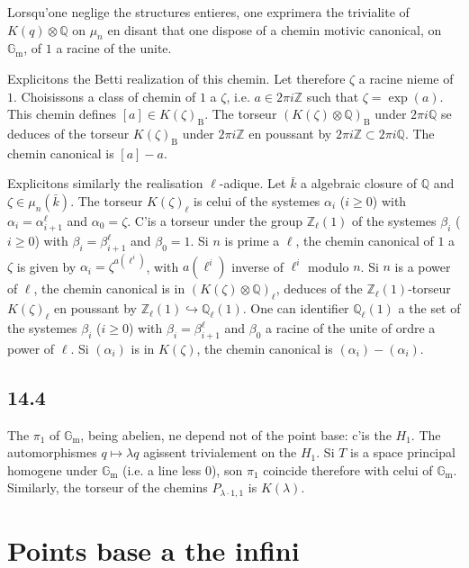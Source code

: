 \documentclass[12pt,a4paper]{article}
\theoremstyle{plain}
\theoremstyle{definition}
\theoremstyle{remark}
\newcommand*{\Gm}{\mathbb{G}_\mathrm{m}}
\newcommand{\bZ}{\mathbb{Z}}
\newcommand{\bQ}{\mathbb{Q}}
\newcommand{\B}{\mathrm{B}}
\begin{document}
Lorsqu'one neglige the structures entieres, one exprimera the trivialite of $K(q) \otimes \bQ$ on $\mu_n$ en disant that one dispose of a chemin motivic canonical, on $\Gm$, of $1$ a racine of the unite.

Explicitons the Betti realization of this chemin. Let therefore $\zeta$ a racine nieme of $1$. Choisissons a class of chemin of $1$ a $\zeta$, i.e. $a \in 2\pi i \bZ$ such that $\zeta = \exp(a)$. This chemin defines $[a] \in K(\zeta)_{\B}$. The torseur $(K(\zeta) \otimes \bQ)_{\B}$ under $2\pi i \bQ$ se deduces of the torseur $K(\zeta)_{\B}$ under $2\pi i \bZ$ en poussant by $2\pi i \bZ \subset 2\pi i \bQ$. The chemin canonical is $[a] - a$.

Explicitons similarly the realisation $\ell$-adique. Let $\bar{k}$ a algebraic closure of $\bQ$ and $\zeta \in \mu_n(\bar{k})$. The torseur $K(\zeta)_{\ell}$ is celui of the systemes $\alpha_i$ ($i \geqslant 0$) with $\alpha_i = \alpha_{i+1}^{\ell}$ and $\alpha_0 = \zeta$. C'is a torseur under the group $\bZ_\ell(1)$ of the systemes $\beta_i$ ($i \geqslant 0$) with $\beta_i = \beta_{i+1}^{\ell}$ and $\beta_0 = 1$. Si $n$ is prime a $\ell$, the chemin canonical of $1$ a $\zeta$ is given by $\alpha_i = \zeta^{a(\ell^i)}$, with $a(\ell^i)$ inverse of $\ell^i$ modulo $n$. Si $n$ is a power of $\ell$, the chemin canonical is in $(K(\zeta) \otimes \bQ)_{\ell}$, deduces of the $\bZ_\ell(1)$-torseur $K(\zeta)_{\ell}$ en poussant by $\bZ_\ell(1) \hookrightarrow \bQ_\ell(1)$. One can identifier $\bQ_\ell(1)$ a the set of the systemes $\beta_i$ ($i \geqslant 0$) with $\beta_i = \beta_{i+1}^{\ell}$ and $\beta_0$ a racine of the unite of ordre a power of $\ell$. Si $(\alpha_i)$ is in $K(\zeta)$, the chemin canonical is $(\alpha_i) - (\alpha_i)$.

\subsection*{14.4}

The $\pi_1$ of $\Gm$, being abelien, ne depend not of the point base: c'is the $H_1$. The automorphismes $q \mapsto \lambda q$ agissent trivialement on the $H_1$. Si $T$ is a space principal homogene under $\Gm$ (i.e. a line less $0$), son $\pi_1$ coincide therefore with celui of $\Gm$. Similarly, the torseur of the chemins $P_{\lambda \cdot 1, 1}$ is $K(\lambda)$.


\section{Points base a the infini}\label{sec:15}
\end{document}
